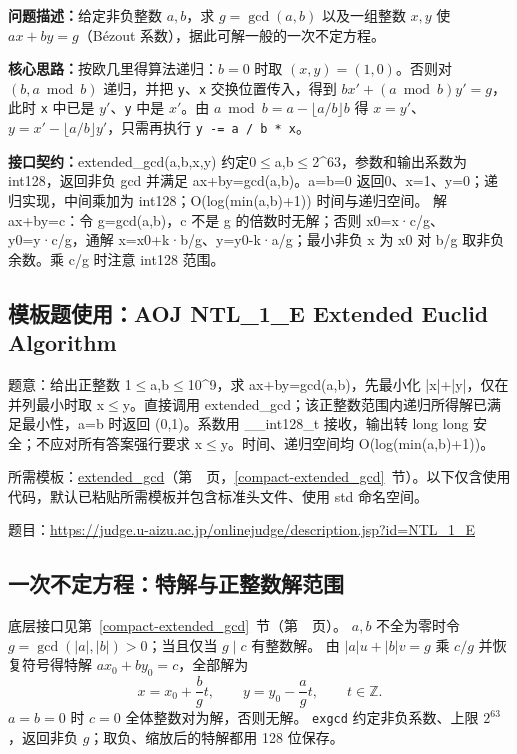 \noindent\textbf{问题描述：}\allowbreak 给定非负整数 $a,b$，求 $g=\gcd(a,b)$ 以及一组整数 $x,y$ 使 $ax+by=g$（Bézout 系数），据此可解一般的一次不定方程。

\textbf{核心思路：}\allowbreak 按欧几里得算法递归：$b=0$ 时取 $(x,y)=(1,0)$。否则对 $(b,a\bmod b)$ 递归，并把 \texttt{y}、\texttt{x} 交换位置传入，得到 $bx'+(a\bmod b)y'=g$，此时 \texttt{x} 中已是 $y'$、\texttt{y} 中是 $x'$。由 $a\bmod b=a-\lfloor a/b\rfloor b$ 得 $x=y'$、$y=x'-\lfloor a/b\rfloor y'$，只需再执行 \texttt{y -= a / b * x}。



{\sloppy{}\noindent\textbf{接口契约：}extended\_gcd(a,b,x,y) 约定0$\le$a,b$\le$2\textasciicircum{}63，参数和输出系数为 int128，返回非负 gcd 并满足 ax+by=gcd(a,b)。a=b=0 返回0、x=1、y=0；递归实现，中间乘加为 int128；O(log(min(a,b)+1)) 时间与递归空间。 解 ax+by=c：令 g=gcd(a,b)，c 不是 g 的倍数时无解；否则 x0=x·c/g、y0=y·c/g，通解 x=x0+k·b/g、y=y0-k·a/g；最小非负 x 为 x0 对 b/g 取非负余数。乘 c/g 时注意 int128 范围。\par}



\Needspace{302pt}

\subsection*{模板题使用：AOJ NTL\_1\_E Extended Euclid Algorithm}

\label{usage-example-221}

题意：给出正整数 1$\le$a,b$\le$10\textasciicircum{}9，求 ax+by=gcd(a,b)，先最小化 |x|+|y|，仅在并列最小时取 x$\le$y。直接调用 extended\_gcd；该正整数范围内递归所得解已满足最小性，a=b 时返回 (0,1)。系数用 \_\_int128\_t 接收，输出转 long long 安全；不应对所有答案强行要求 x$\le$y。时间、递归空间均 O(log(min(a,b)+1))。

所需模板：\hyperref[compact-extended_gcd]{extended\_\allowbreak{}gcd}（第~\pageref{compact-extended_gcd}~页，\ref{compact-extended_gcd}~节）。以下仅含使用代码，默认已粘贴所需模板并包含标准头文件、使用 std 命名空间。

题目：\url{https://judge.u-aizu.ac.jp/onlinejudge/description.jsp?id=NTL_1_E}



\newpage

\subsection{一次不定方程：特解与正整数解范围}\label{knowledge-diophantine-bounds}
底层接口见第~\ref{compact-extended_gcd}~节（第~\pageref{compact-extended_gcd}~页）。
$a,b$ 不全为零时令 $g=\gcd(|a|,|b|)>0$；当且仅当 $g\mid c$ 有整数解。
由 $|a|u+|b|v=g$ 乘 $c/g$ 并恢复符号得特解 $ax_0+by_0=c$，全部解为
\[
x=x_0+\frac bg t,\qquad y=y_0-\frac ag t,\qquad t\in\mathbb Z.
\]
$a=b=0$ 时 $c=0$ 全体整数对为解，否则无解。
\texttt{exgcd} 约定非负系数、上限 $2^{63}$，返回非负 $g$；取负、缩放后的特解都用 128 位保存。

